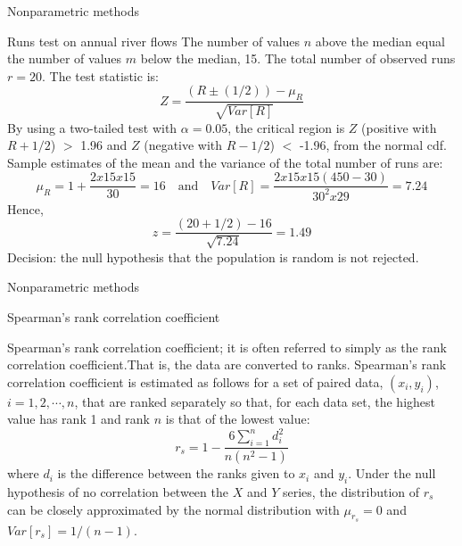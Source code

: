 \documentclass[8pt]{beamer}
\renewcommand{\emph}[1]{\textcolor{myorange}{#1}}
\begin{document}
\begin{frame}{Nonparametric methods}

    \begin{exampleblock}{Runs test on annual river flows}
  The number of values $n$ \emph{above the median} equal the number of values $m$ \emph{below the median}, 15. The total number of observed \emph{runs} $r = 20$. The test statistic is:
  \[
      Z = \frac{(R \pm (1/2) )- \mu_R}{\sqrt{Var[R]}}
      \]
      By using a two-tailed test with $\alpha = 0.05$, the \emph{critical region} is $Z$ (positive with $R + 1/2$) $>$ 1.96 and $Z$ (negative with $R - 1/2$) $<$ -1.96, from  the \emph{normal cdf}. Sample estimates of the \emph{mean} and the \emph{variance} of the total number of runs are:
      \[
          \mu_R = 1 + \frac{2 x 15 x 15}{30} = 16 \quad \text{and} \quad Var[R] = \frac{2 x 15 x 15(450-30)}{30^2 x 29} = 7.24
      \]
      Hence,
      \[
          z = \frac{(20 + 1/2) - 16}{\sqrt{7.24}} = 1.49
      \]
\emph{Decision: the null hypothesis that the population is random is not rejected}.
    \end{exampleblock}
    \end{frame}

\begin{frame}{Nonparametric methods}

    \begin{block}{Spearman’s rank correlation coefficient}
    \end{block}
    \alert{Spearman's rank correlation coefficient}; it is often referred to simply as the \emph{rank correlation coefficient}.That is, the data are converted to ranks.  \emph{Spearman's rank correlation coefficient} is estimated as follows for a set of paired data, $(x_i , y_i)$, $i = 1, 2, \cdots, n$, that are ranked separately so that, for each data set, the highest value has rank 1 and rank $n$ is that of the lowest value:
    \[
        r_s = 1 - \frac{6\sum_{i=1}^n d_i^2}{n(n^2 -1)}
    \]
    where $d_i$ is the difference between the ranks given to $x_i$ and $y_i$. Under the \emph{null hypothesis} of no correlation between the $X$ and $Y$ series, the distribution of $r_s$ can be closely approximated by the \emph{normal distribution} with $\mu_{r_s} = 0$ and $Var[r_s ] = 1/(n-1)$.
    \end{frame}
\end{document}
